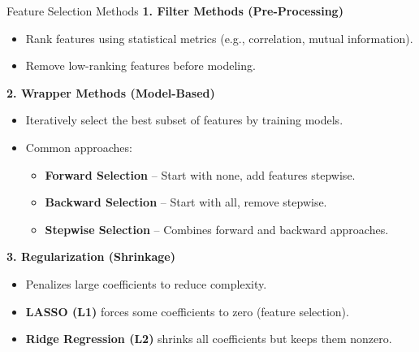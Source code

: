\documentclass[aspectratio=169,xcolor=dvipsnames]{beamer}
\begin{document}
\begin{frame}{Feature Selection Methods}
    \textbf{1. Filter Methods (Pre-Processing)}
    \begin{itemize}
        \item Rank features using statistical metrics (e.g., correlation, mutual information).
        \item Remove low-ranking features before modeling.
    \end{itemize}

    \bigskip

    \textbf{2. Wrapper Methods (Model-Based)}
    \begin{itemize}
        \item Iteratively select the best subset of features by training models.
        \item Common approaches:
        \begin{itemize}
            \item \textbf{Forward Selection} – Start with none, add features stepwise.
            \item \textbf{Backward Selection} – Start with all, remove stepwise.
            \item \textbf{Stepwise Selection} – Combines forward and backward approaches.
        \end{itemize}
    \end{itemize}

    \bigskip

    \textbf{3. Regularization (Shrinkage)}
    \begin{itemize}
        \item Penalizes large coefficients to reduce complexity.
        \item \textbf{LASSO (L1)} forces some coefficients to zero (feature selection).
        \item \textbf{Ridge Regression (L2)} shrinks all coefficients but keeps them nonzero.
    \end{itemize}
\end{frame}
\end{document}
